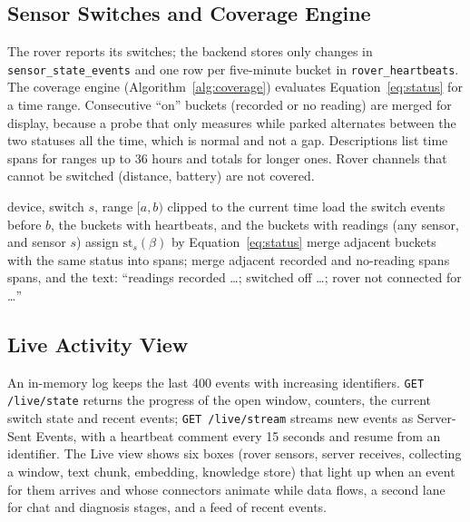 \subsection{Sensor Switches and Coverage Engine}

The rover reports its switches; the backend stores only changes in \texttt{sensor\_state\_events} and one row per five-minute bucket in
\texttt{rover\_heartbeats}. The coverage engine (Algorithm~\ref{alg:coverage}) evaluates Equation~\ref{eq:status} for a time range. Consecutive ``on''
buckets (recorded or no reading) are merged for display, because a probe that only measures while parked alternates between the
two statuses all the time, which is normal and not a gap. Descriptions list time spans for ranges up to 36 hours and totals for longer ones.
Rover channels that cannot be switched (distance, battery) are not covered.

\begin{algorithm}[H]
\caption{Coverage of one sensor switch over a range}
\label{alg:coverage}
\begin{algorithmic}[1]
\Require device, switch $s$, range $[a,b)$ clipped to the current time
\State load the switch events before $b$, the buckets with heartbeats, and the buckets with readings (any sensor, and sensor $s$)
\ForAll{five-minute bucket $\beta$ in $[a,b)$}
  \State assign $\mathrm{st}_s(\beta)$ by Equation~\ref{eq:status}
\EndFor
\State merge adjacent buckets with the same status into spans; merge adjacent recorded and no-reading spans
\State \Return spans, and the text: ``readings recorded \ldots; switched off \ldots; rover not connected for \ldots''
\end{algorithmic}
\end{algorithm}

\subsection{Live Activity View}

An in-memory log keeps the last 400 events with increasing identifiers. \texttt{GET /live/state} returns the progress of the open window,
counters, the current switch state and recent events; \texttt{GET /live/stream} streams new events as Server-Sent Events, with a
heartbeat comment every 15 seconds and resume from an identifier. The Live view shows six boxes (rover sensors, server receives,
collecting a window, text chunk, embedding, knowledge store) that light up when an event for them arrives and whose connectors
animate while data flows, a second lane for chat and diagnosis stages, and a feed of recent events.

